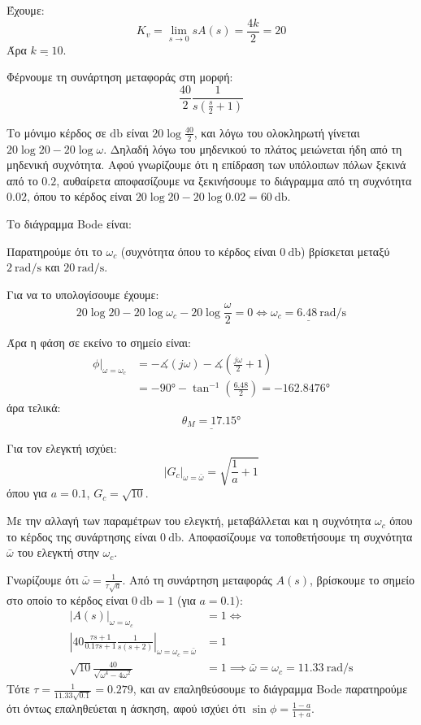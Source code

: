\documentclass[11pt,a4paper,notitlepage,fleqn]{article}
\begin{document}
\begin{exercise}
\begin{enumgreekparen}
	Έχουμε:
	\[
	K_v = \lim_{s\to 0} sA(s) = \frac{4k}{2} = 20
	\]
	Άρα \( \underline{k=10} \).
	\item
	Φέρνουμε τη συνάρτηση μεταφοράς στη μορφή:
	\[
	\frac{40}{2}\frac{1}{s\left( \frac{s}{2}+1 \right)}
	\]
	
	Το μόνιμο κέρδος σε \( \si{\decibel} \) είναι \( 20\log\frac{40}{2} \), και λόγω
	του ολοκληρωτή γίνεται \( 20\log20 - 20\log\omega \). Δηλαδή λόγω του μηδενικού
	το πλάτος μειώνεται ήδη από τη μηδενική συχνότητα. Αφού γνωρίζουμε ότι η επίδραση των
	υπόλοιπων πόλων ξεκινά από το \( 0.2 \), αυθαίρετα αποφασίζουμε να ξεκινήσουμε το
	διάγραμμα από τη συχνότητα \( 0.02 \), όπου το κέρδος είναι \( 20\log20-20\log0.02
	= \SI{60}{\decibel} \).
	
	Το διάγραμμα Bode είναι:
	
	Παρατηρούμε ότι το \( \omega_c \) (συχνότητα όπου το κέρδος είναι \( \SI{0}{\decibel} \))
	βρίσκεται μεταξύ \( \SI{2}{\radian/\second} \) και \( \SI{20}{\radian/\second} \).
	
	Για να το υπολογίσουμε έχουμε:
	\[
	20\log20 - 20\log\omega_c - 20\log\frac{\omega}{2} = 0
	\iff \underline{\omega_c = \SI{6.48}{\radian/\second}}
	\]
	
	Άρα η φάση σε εκείνο το σημείο είναι:
	\begin{align*}
	\left.\phi\right|_{\omega=\omega_c} &= -\measuredangle (j\omega )
	-\measuredangle\left(\frac{j\omega }{2}+1\right)\\
	&= -\ang{90} - \tan^{-1}\left(\frac{6.48}{2}\right)
	= \ang{-162.8476}
	\end{align*}
	άρα τελικά:
	\[
	\underline{\theta_M = \ang{17.15}}
	\]
	
	\item Για τον ελεγκτή ισχύει:
	\[
	\left|G_c\right|_{\omega=\bar\omega} = \sqrt{\frac{1}{a} + 1}
	\]
	όπου για \( a=0.1 \), \( G_c = \sqrt{10} \).
	
	Με την αλλαγή των παραμέτρων του ελεγκτή, μεταβάλλεται και η συχνότητα \( \omega_c \)
	όπου το κέρδος της συνάρτησης είναι \( \SI{0}{\decibel} \). Αποφασίζουμε να τοποθετήσουμε
	τη συχνότητα \( \bar\omega \) του ελεγκτή στην \( \omega_c \).
	
	Γνωρίζουμε ότι \( \bar\omega = \frac{1}{τ\sqrt{a}} \). Από τη συνάρτηση μεταφοράς
	\( A(s) \), βρίσκουμε το σημείο στο οποίο το κέρδος είναι \( \SI{0}{\decibel} = 1 \)
	(για \( a=0.1 \)):
	\begin{align*}
	\left|A(s)\right|_{\omega=\omega_c} &= 1 \iff \\
		\left| 40\frac{τs+1}{0.1τs+1}\frac{1}{s(s+2)}\right|_{\omega=\omega_c=\bar\omega} &= 1\\
		\sqrt{10}\frac{40}{\sqrt{\omega^4-4\omega^2}}&=1 \implies
	\bar\omega = \omega_c = \SI{11.33}{\radian/\second}
	\end{align*}
	Τότε \( τ=\frac{1}{11.33\sqrt{0.1}}=0.279 \), και αν επαληθεύσουμε το διάγραμμα Bode
	παρατηρούμε ότι όντως επαληθεύεται η άσκηση, αφού ισχύει ότι \( \sin\phi = \frac{1-a}{1+a} \).
\end{enumgreekparen}
\end{exercise}
\end{document}
